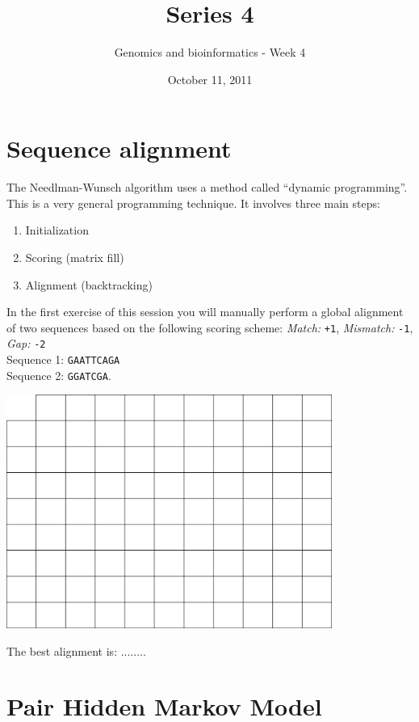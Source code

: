 \documentclass[a4paper,11pt]{article}
\title{Series 4}
\date{October 11, 2011}
\author{Genomics and bioinformatics - Week 4}
\begin{document}
\maketitle




\section{Sequence alignment}
The Needlman-Wunsch algorithm uses a method called ``dynamic programming''. This is a very general programming technique. It involves three main steps:
\begin{enumerate}
\item Initialization
\item Scoring (matrix fill)
\item Alignment (backtracking)
\end{enumerate}
In the first exercise of this session you will manually perform a global alignment of two sequences based on the following scoring scheme:
\emph{Match:} \texttt{+1}, \emph{Mismatch:} \texttt{-1}, \emph{Gap:} \texttt{-2}\\
Sequence 1: \texttt{GAATTCAGA}\\
Sequence 2: \texttt{GGATCGA}.
\vspace{0.5cm}
\begin{center}
\includegraphics[width=0.8\textwidth]{matrix.png}
\end{center}
\vspace{0.5cm}
The best alignment is: ........\\

 
\section{Pair Hidden Markov Model}
\end{document}
